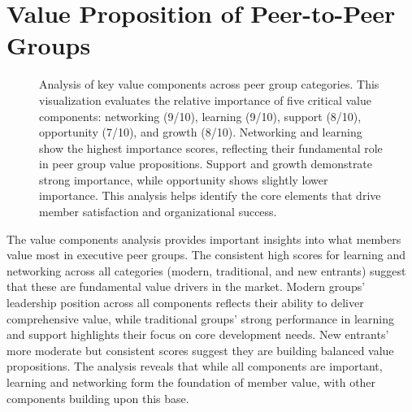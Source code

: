 \documentclass[conference]{IEEEtran}
\begin{document}
\section{Value Proposition of Peer-to-Peer Groups}

\begin{figure}[t]
\centering
{}
\caption{Analysis of key value components across peer group categories. 
This visualization evaluates the relative importance of five critical value components: 
networking (9/10), learning (9/10), support (8/10), opportunity (7/10), and growth (8/10). 
Networking and learning show the highest importance scores, reflecting their fundamental role 
in peer group value propositions. Support and growth demonstrate strong importance, while 
opportunity shows slightly lower importance. This analysis helps identify the core elements 
that drive member satisfaction and organizational success.}
\label{fig:value_components}
\end{figure}

The value components analysis provides important insights into what members value most in executive peer groups. The consistent high scores for learning and networking across all categories (modern, traditional, and new entrants) suggest that these are fundamental value drivers in the market. Modern groups' leadership position across all components reflects their ability to deliver comprehensive value, while traditional groups' strong performance in learning and support highlights their focus on core development needs. New entrants' more moderate but consistent scores suggest they are building balanced value propositions. The analysis reveals that while all components are important, learning and networking form the foundation of member value, with other components building upon this base.
\end{document}
